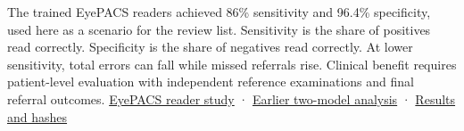 \documentclass[
  10pt,
]{article}
\begin{document}
The trained EyePACS readers achieved 86\% sensitivity and 96.4\%
specificity, used here as a scenario for the review list. Sensitivity is
the share of positives read correctly. Specificity is the share of
negatives read correctly. At lower sensitivity, total errors can fall
while missed referrals rise. Clinical benefit requires patient-level
evaluation with independent reference examinations and final referral
outcomes. \href{https://pubmed.ncbi.nlm.nih.gov/37113471/}{EyePACS
reader study} · \href{review-failures.en.md}{Earlier two-model analysis}
· \href{calibrated-defocus-results.json}{Results and hashes}
\end{document}
